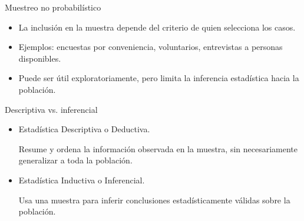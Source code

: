 \documentclass{beamer}
\begin{document}
\begin{frame}{Muestreo no probabilístico}
\begin{itemize}
\item La inclusión en la muestra depende del criterio de quien selecciona los casos.
\item Ejemplos: encuestas por conveniencia, voluntarios, entrevistas a personas disponibles.
\item Puede ser útil exploratoriamente, pero limita la inferencia estadística hacia la población.
\end{itemize}
\end{frame}




\begin{frame}{Descriptiva vs. inferencial}
   \begin{itemize}
       \item {\color{blue}Estad\'istica Descriptiva o Deductiva.}  
       
       Resume y ordena la información observada en la muestra, sin necesariamente generalizar a toda la población.
\item {\color{blue}Estad\'istica Inductiva o Inferencial.} 

Usa una muestra para inferir conclusiones estadísticamente válidas sobre la población.
   \end{itemize} 
\end{frame}
\end{document}
